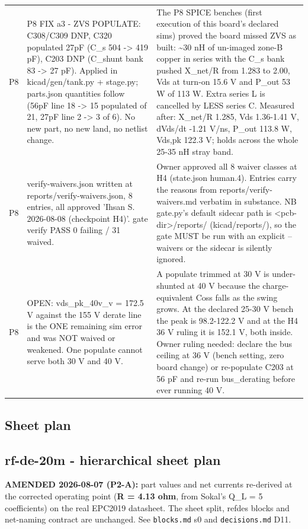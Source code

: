 \documentclass[11pt,a4paper]{article}
\begin{document}
{\begin{longtable}{lp{5.2cm}p{7.2cm}}
P8 & P8 FIX a3 - ZVS POPULATE: C308/C309 DNP, C320 populated 27pF (C\_s 504 -\textgreater{} 419 pF), C203 DNP (C\_shunt bank 83 -\textgreater{} 27 pF). Applied in kicad/gen/tank.py + stage.py; parts.json quantities follow (56pF line 18 -\textgreater{} 15 populated of 21, 27pF line 2 -\textgreater{} 3 of 6). No new part, no new land, no netlist change. & The P8 SPICE benches (first execution of this board's declared sims) proved the board missed ZVS as built: \textasciitilde{}30 nH of un-imaged zone-B copper in series with the C\_s bank pushed X\_net/R from 1.283 to 2.00, Vds at turn-on 15.6 V and P\_out 53 W of 113 W. Extra series L is cancelled by LESS series C. Measured after: X\_net/R 1.285, Vds 1.36-1.41 V, dVds/dt -1.21 V/ns, P\_out 113.8 W, Vds,pk 122.3 V; holds across the whole 25-35 nH stray band. \\
P8 & verify-waivers.json written at reports/verify-waivers.json, 8 entries, all approved 'Ihsan S. 2026-08-08 (checkpoint H4)'. gate verify PASS 0 failing / 31 waived. & Owner approved all 8 waiver classes at H4 (state.json human.4). Entries carry the reasons from reports/verify-waivers.md verbatim in substance. NB gate.py's default sidecar path is \textless{}pcb-dir\textgreater{}/reports/ (kicad/reports/), so the gate MUST be run with an explicit --waivers or the sidecar is silently ignored. \\
P8 & OPEN: vds\_pk\_40v\_v = 172.5 V against the 155 V derate line is the ONE remaining sim error and was NOT waived or weakened. One populate cannot serve both 30 V and 40 V. & A populate trimmed at 30 V is under-shunted at 40 V because the charge-equivalent Coss falls as the swing grows. At the declared 25-30 V bench the peak is 98.2-122.2 V and at the H4 36 V ruling it is 152.1 V, both inside. Owner ruling needed: declare the bus ceiling at 36 V (bench setting, zero board change) or re-populate C203 at 56 pF and re-run bus\_derating before ever running 40 V. \\
\bottomrule
\end{longtable}
}
\subsection*{Sheet plan}
\subsection*{rf-de-20m - hierarchical sheet plan}
\textbf{AMENDED 2026-08-07 (P2-A):} part values and net currents re-derived at the corrected operating point (\textbf{R = 4.13 ohm}, from Sokal's Q\_L = 5 coefficients) on the real EPC2019 datasheet. The sheet split, refdes blocks and net-naming contract are unchanged. See \texttt{blocks.md} s0 and \texttt{decisions.md} D11.
\end{document}
